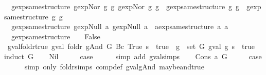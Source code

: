 \begin{isabellebody}
\ \ {\isachardoublequoteopen}gexp{\isacharunderscore}same{\isacharunderscore}structure\ {\isacharparenleft}gexp{\isachardot}Nor\ g{}\ g{}{\isacharparenright}\ {\isacharparenleft}gexp{\isachardot}Nor\ g{}{\isacharprime}\ g{}{\isacharprime}{\isacharparenright}\ {\isacharequal}\ {\isacharparenleft}gexp{\isacharunderscore}same{\isacharunderscore}structure\ g{}\ g{}{\isacharprime}\ {\isasymand}\ gexp{\isacharunderscore}same{\isacharunderscore}structure\ g{}\ g{}{\isacharprime}{\isacharparenright}{\isachardoublequoteclose}\ {\isacharbar}\isanewline
\ \ {\isachardoublequoteopen}gexp{\isacharunderscore}same{\isacharunderscore}structure\ {\isacharparenleft}gexp{\isachardot}Null\ a{}{\isacharparenright}\ {\isacharparenleft}gexp{\isachardot}Null\ a{}{\isacharparenright}\ {\isacharequal}\ aexp{\isacharunderscore}same{\isacharunderscore}structure\ a{}\ a{}{\isachardoublequoteclose}\ {\isacharbar}\isanewline
\ \ {\isachardoublequoteopen}gexp{\isacharunderscore}same{\isacharunderscore}structure\ {\isacharunderscore}\ {\isacharunderscore}\ {\isacharequal}\ False{\isachardoublequoteclose}\isanewline
\isanewline
{}\isamarkupfalse%
\ gval{\isacharunderscore}foldr{\isacharunderscore}true{\isacharcolon}\ {\isachardoublequoteopen}{\isacharparenleft}gval\ {\isacharparenleft}foldr\ gAnd\ G\ {\isacharparenleft}Bc\ True{\isacharparenright}{\isacharparenright}\ s\ {\isacharequal}\ true{\isacharparenright}\ {\isacharequal}\ {\isacharparenleft}{\isasymforall}g\ {\isasymin}\ set\ G{\isachardot}\ gval\ g\ s\ {\isacharequal}\ true{\isacharparenright}{\isachardoublequoteclose}\isanewline
%
\isadelimproof
%
\endisadelimproof
%
\isatagproof
{}\isamarkupfalse%
{\isacharparenleft}induct\ G{\isacharparenright}\isanewline
\ \ \isamarkupfalse%
\ Nil\isanewline
\ \ \isamarkupfalse%
\ \isamarkupfalse%
\ {\isacharquery}case\isanewline
\ \ \ \ \isamarkupfalse%
\ {\isacharparenleft}simp\ add{\isacharcolon}\ gval{\isachardot}simps{\isacharparenright}\isanewline
{}\isamarkupfalse%
\isanewline
\ \ \isamarkupfalse%
\ {\isacharparenleft}Cons\ a\ G{\isacharparenright}\isanewline
\ \ \isamarkupfalse%
\ \isamarkupfalse%
\ {\isacharquery}case\isanewline
\ \ \ \ \isamarkupfalse%
\ {\isacharparenleft}simp\ only{\isacharcolon}\ foldr{\isachardot}simps\ comp{\isacharunderscore}def\ gval{\isacharunderscore}gAnd\ maybe{\isacharunderscore}and{\isacharunderscore}true{\isacharparenright}\isanewline

\end{isabellebody}
